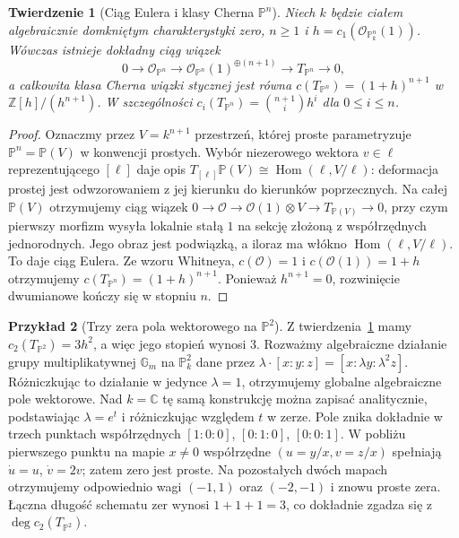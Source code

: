 \documentclass[11pt,a4paper,openany]{report}
\numberwithin{equation}{section}
\theoremstyle{plain}
\newtheorem{twierdzenie}{Twierdzenie}[section]
\theoremstyle{definition}
\newtheorem{przyklad}[twierdzenie]{Przykład}
\theoremstyle{remark}
\newcommand{\Z}{\mathbb Z}
\newcommand{\C}{\mathbb C}
\newcommand{\PP}{\mathbb P}
\begin{document}
\begin{twierdzenie}[Ciąg Eulera i klasy Cherna $\PP^n$]
\label{tw:ga7-euler}
Niech $k$ będzie ciałem algebraicznie domkniętym
charakterystyki zero, $n\ge1$ i
$h=c_1(\mathcal O_{\PP^n_k}(1))$.
Wówczas istnieje dokładny ciąg wiązek
\[
0\longrightarrow\mathcal O_{\PP^n}
\longrightarrow\mathcal O_{\PP^n}(1)^{\oplus(n+1)}
\longrightarrow T_{\PP^n}\longrightarrow0,
\]
a całkowita klasa Cherna wiązki stycznej jest równa
$c(T_{\PP^n})=(1+h)^{n+1}$ w
$\Z[h]/(h^{n+1})$. W szczególności
$c_i(T_{\PP^n})=\binom{n+1}{i}h^i$ dla $0\le i\le n$.
\end{twierdzenie}
\begin{proof}
Oznaczmy przez $V=k^{n+1}$ przestrzeń, której proste
parametryzuje $\PP^n=\PP(V)$ w konwencji prostych.
Wybór niezerowego wektora $v\in\ell$ reprezentującego
$[\ell]$ daje opis
$T_{[\ell]}\PP(V)\cong\operatorname{Hom}(\ell,V/\ell)$:
deformacja prostej jest odwzorowaniem z jej kierunku
do kierunków poprzecznych. Na całej $\PP(V)$ otrzymujemy
ciąg wiązek
$0\to\mathcal O\to\mathcal O(1)\otimes V
\to T_{\PP(V)}\to0$, przy czym pierwszy morfizm
wysyła lokalnie stałą $1$ na sekcję złożoną z
współrzędnych jednorodnych. Jego obraz jest podwiązką,
a iloraz ma włókno $\operatorname{Hom}(\ell,V/\ell)$.
To daje ciąg Eulera. Ze wzoru Whitneya,
$c(\mathcal O)=1$ i $c(\mathcal O(1))=1+h$
otrzymujemy $c(T_{\PP^n})=(1+h)^{n+1}$.
Ponieważ $h^{n+1}=0$, rozwinięcie dwumianowe
kończy się w stopniu $n$.
\end{proof}

\begin{przyklad}[Trzy zera pola wektorowego na $\PP^2$]
\label{prz:ga7-vector-field}
Z twierdzenia~\ref{tw:ga7-euler} mamy
$c_2(T_{\PP^2})=3h^2$, a więc jego stopień wynosi $3$.
Rozważmy algebraiczne działanie grupy multiplikatywnej
$\mathbb G_m$ na $\PP^2_k$ dane przez
$\lambda\cdot[x:y:z]=[x:\lambda y:\lambda^2 z]$.
Różniczkując to działanie w jedynce $\lambda=1$,
otrzymujemy globalne algebraiczne pole wektorowe.
Nad $k=\C$ tę samą konstrukcję można zapisać
analitycznie, podstawiając $\lambda=e^t$
i różniczkując względem $t$ w zerze.
Pole znika dokładnie w trzech punktach współrzędnych
$[1:0:0]$, $[0:1:0]$, $[0:0:1]$.
W pobliżu pierwszego punktu na mapie $x\ne0$
współrzędne $(u=y/x,v=z/x)$ spełniają
$\dot u=u$, $\dot v=2v$; zatem zero jest proste.
Na pozostałych dwóch mapach otrzymujemy odpowiednio
wagi $(-1,1)$ oraz $(-2,-1)$ i znowu proste zera.
Łączna długość schematu zer wynosi $1+1+1=3$,
co dokładnie zgadza się z $\deg c_2(T_{\PP^2})$.
\end{przyklad}
\end{document}
